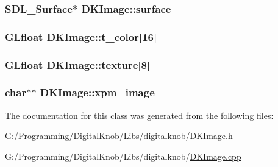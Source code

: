 \hypertarget{class_d_k_image_ab8cc39cd81a6f73beca7392f6cb67abe}{
\subsubsection[{surface}]{\setlength{\rightskip}{0pt plus 5cm}S\-D\-L\-\_\-\-Surface$\ast$ D\-K\-Image\-::surface}}\label{class_d_k_image_ab8cc39cd81a6f73beca7392f6cb67abe}
\hypertarget{class_d_k_image_ae6c9b9d773b56e6be7bc6fd3d299eb47}{
\subsubsection[{t\-\_\-color}]{\setlength{\rightskip}{0pt plus 5cm}G\-Lfloat D\-K\-Image\-::t\-\_\-color\mbox{[}16\mbox{]}}}\label{class_d_k_image_ae6c9b9d773b56e6be7bc6fd3d299eb47}
\hypertarget{class_d_k_image_a83ea3b25f68ec8d02b6a5b4daf18a2d5}{
\subsubsection[{texture}]{\setlength{\rightskip}{0pt plus 5cm}G\-Lfloat D\-K\-Image\-::texture\mbox{[}8\mbox{]}}}\label{class_d_k_image_a83ea3b25f68ec8d02b6a5b4daf18a2d5}
\hypertarget{class_d_k_image_a5552759919ce7e0ad63c542838e19fbe}{
\subsubsection[{xpm\-\_\-image}]{\setlength{\rightskip}{0pt plus 5cm}char$\ast$$\ast$ D\-K\-Image\-::xpm\-\_\-image}}\label{class_d_k_image_a5552759919ce7e0ad63c542838e19fbe}


The documentation for this class was generated from the following files\-:\begin{DoxyCompactItemize}
\item 
G\-:/\-Programming/\-Digital\-Knob/\-Libs/digitalknob/\hyperlink{_d_k_image_8h}{D\-K\-Image.\-h}\item 
G\-:/\-Programming/\-Digital\-Knob/\-Libs/digitalknob/\hyperlink{_d_k_image_8cpp}{D\-K\-Image.\-cpp}\end{DoxyCompactItemize}

